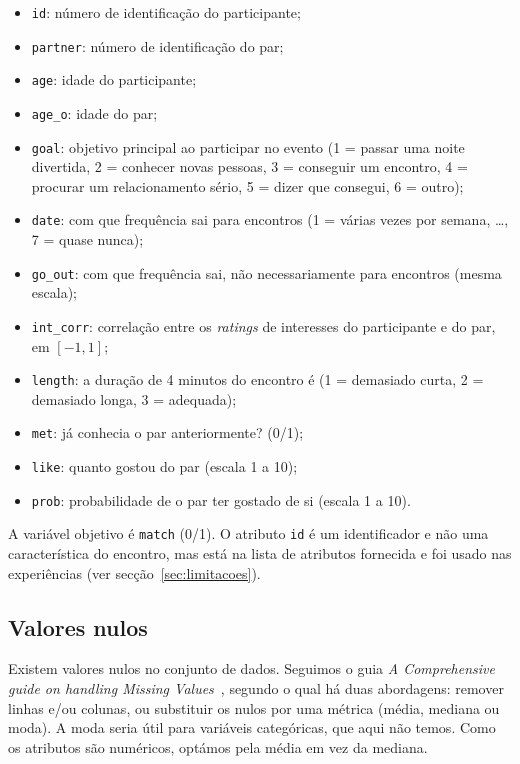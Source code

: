 \documentclass[12pt,a4paper]{article}
\newcommand{\code}[1]{\texttt{#1}}
\begin{document}
\begin{itemize}[noitemsep]
  \item \code{id}: número de identificação do participante;
  \item \code{partner}: número de identificação do par;
  \item \code{age}: idade do participante;
  \item \code{age\_o}: idade do par;
  \item \code{goal}: objetivo principal ao participar no evento (1 = passar uma noite divertida, 2 = conhecer novas pessoas, 3 = conseguir um encontro, 4 = procurar um relacionamento sério, 5 = dizer que consegui, 6 = outro);
  \item \code{date}: com que frequência sai para encontros (1 = várias vezes por semana, \dots, 7 = quase nunca);
  \item \code{go\_out}: com que frequência sai, não necessariamente para encontros (mesma escala);
  \item \code{int\_corr}: correlação entre os \emph{ratings} de interesses do participante e do par, em $[-1,1]$;
  \item \code{length}: a duração de 4 minutos do encontro é (1 = demasiado curta, 2 = demasiado longa, 3 = adequada);
  \item \code{met}: já conhecia o par anteriormente? (0/1);
  \item \code{like}: quanto gostou do par (escala 1 a 10);
  \item \code{prob}: probabilidade de o par ter gostado de si (escala 1 a 10).
\end{itemize}

A variável objetivo é \code{match} (0/1). O atributo \code{id} é um identificador e não uma característica do encontro, mas está na lista de atributos fornecida e foi usado nas experiências (ver secção~\ref{sec:limitacoes}).

\subsection{Valores nulos}

Existem valores nulos no conjunto de dados. Seguimos o guia \emph{A Comprehensive guide on handling Missing Values}~\cite{missing}, segundo o qual há duas abordagens: remover linhas e/ou colunas, ou substituir os nulos por uma métrica (média, mediana ou moda). A moda seria útil para variáveis categóricas, que aqui não temos. Como os atributos são numéricos, optámos pela média em vez da mediana.
\end{document}
